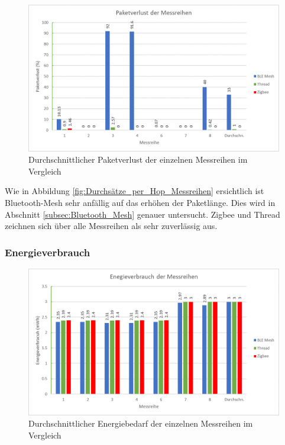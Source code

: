 \begin{figure}
	\centering
	\includegraphics[width=1.0\textwidth]{graphics/Paketverlust_Messreihen.png}
	\caption{Durchschnittlicher Paketverlust der einzelnen Messreihen im Vergleich}\label{fig:PaketverlusteMessreihen}
\end{figure}

Wie in Abbildung \ref{fig:Durchsätze_per_Hop_Messreihen} ersichtlich ist Bluetooth-Mesh sehr anfällig auf das erhöhen der Paketlänge. Dies wird in Abschnitt \ref{subsec:Bluetooth_Mesh} genauer untersucht. Zigbee und Thread zeichnen sich über alle Messreihen als sehr zuverlässig aus. 


\subsubsection{Energieverbrauch}\label{subsec:VergleichEnergieverbrauchMessreihen}


\begin{figure}[h]
	\centering
	\includegraphics[width=1.0\textwidth]{graphics/Energieverbrauch_Messreihen.png}
	\caption{Durchschnittlicher Energiebedarf der einzelnen Messreihen im Vergleich}\label{fig:EnergieverbrauchMessreihen}
\end{figure}

